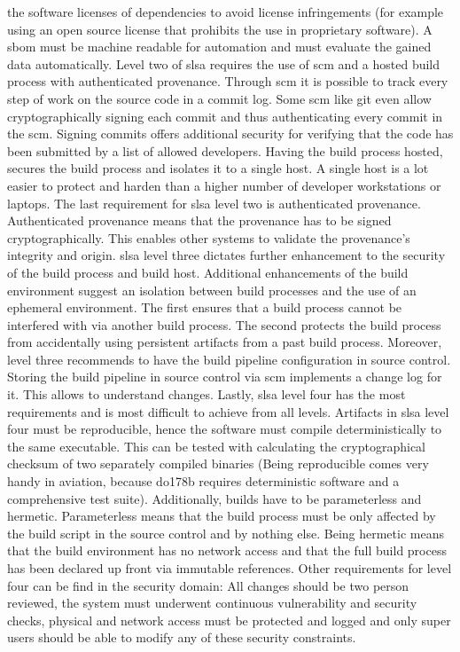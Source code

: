 \documentclass[titlepage]{report}
\begin{document}
the software licenses of dependencies to avoid license infringements (for example using an open source license that prohibits the use in proprietary software)\cite{SBOM}. A \gls{sbom} must be machine readable for automation and must evaluate the gained data
automatically. Level two of \gls{slsa} requires the use of \gls{scm} and a hosted build process with authenticated provenance\cite{SLSALevels}. Through \gls{scm} it is possible to track every step of work on the source code in a commit log. Some \gls{scm} like
git even allow cryptographically signing each commit and thus authenticating every commit in the \gls{scm}. Signing commits offers additional security for verifying that the code has been submitted by a list of allowed developers. Having the build process
hosted, secures the build process and isolates it to a single host. A single host is a lot easier to protect and harden than a higher number of developer workstations or laptops. The last requirement for \gls{slsa} level two is authenticated provenance.
Authenticated provenance means that the provenance has to be signed cryptographically. This enables other systems to validate the provenance's integrity and origin. \gls{slsa} level three dictates further enhancement to the security of the build process
and build host. Additional enhancements of the build environment suggest an isolation between build processes and the use of an ephemeral environment. The first ensures that a build process cannot be interfered with via another build process. The second
protects the build process from accidentally using persistent artifacts from a past build process. Moreover, level three recommends to have the build pipeline configuration in source control\cite{SLSARequirements}. Storing the build pipeline in source control
via \gls{scm} implements a change log for it. This allows to understand changes. Lastly, \gls{slsa} level four has the most requirements and is most difficult to achieve from all levels. Artifacts in \gls{slsa} level four must be reproducible, hence the software
must compile deterministically to the same executable\cite{SLSARequirements}. This can be tested with calculating the cryptographical checksum of two separately compiled binaries (Being reproducible comes very handy in aviation, because \gls{do178b} requires deterministic software and a comprehensive test suite).
Additionally, builds have to be parameterless and hermetic. Parameterless means that the build process must be only affected by the build script in the source control and by nothing else. Being hermetic means that the build environment has no network access
and that the full build process has been declared up front via immutable references\cite{SLSARequirements}. Other requirements for level four can be find in the security domain: All changes should be two person reviewed, the system must underwent continuous
vulnerability and security checks, physical and network access must be protected and logged and only super users should be able to modify any of these security constraints\cite{SLSARequirements}.
\end{document}

